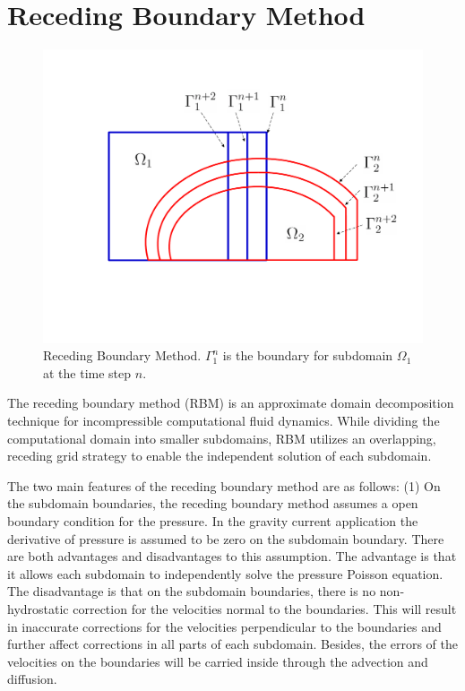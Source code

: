 \normalsize
\section{Receding Boundary Method}


\begin{figure}[h]
  \begin{center}
    \includegraphics[scale=0.35]{../figures/RecedingBoundaryMethod.pdf}
    \caption{Receding Boundary Method. $\Gamma^n_1$ is the boundary for subdomain $\Omega_1$ at the time step $n$. }
    \label{fig:RecedingBoundaryMethod}
  \end{center}
\end{figure}

The receding boundary method (RBM) is an approximate domain decomposition technique for incompressible computational fluid dynamics. While dividing the computational domain into smaller subdomains, RBM utilizes an overlapping, receding grid strategy to enable the independent solution of each subdomain.

The two main features of the receding boundary method are as follows:
(1) On the subdomain boundaries, the receding boundary method assumes a open boundary condition for the pressure. In the gravity current application the derivative of pressure is assumed to be zero on the subdomain boundary. There are both advantages and disadvantages to this assumption. The advantage is that it allows each subdomain to independently solve the pressure Poisson equation. The disadvantage is that on the subdomain boundaries, there is no non-hydrostatic correction for the velocities normal to the boundaries. This will result in inaccurate corrections for the velocities perpendicular to the boundaries and further affect corrections in all parts of each subdomain. Besides, the errors of the velocities on the boundaries will be carried inside through the advection and diffusion.


